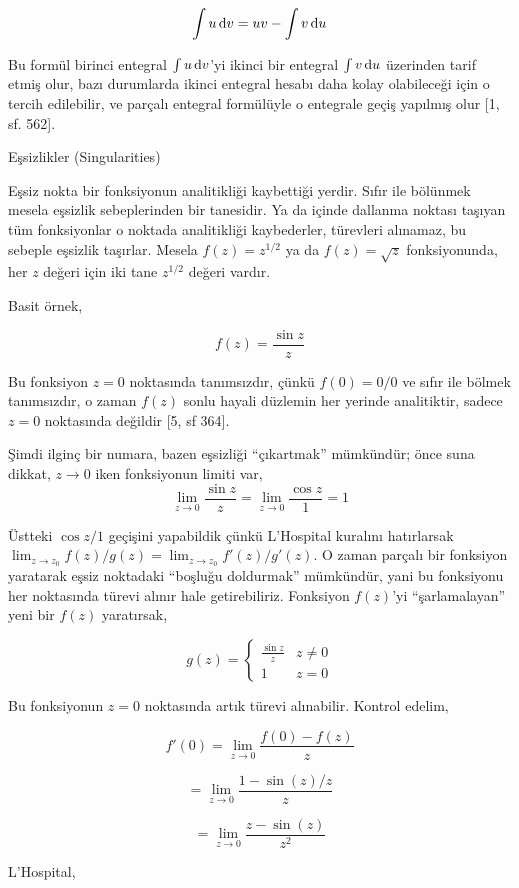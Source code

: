 \documentclass[12pt,fleqn]{article}\usepackage{../../common}
\begin{document}
$$ \int u \,\mathrm{d} v = uv - \int v \,\mathrm{d} u$$

Bu formül birinci entegral $\int u \,\mathrm{d} v$'yi ikinci bir entegral $\int v \,\mathrm{d} u$
üzerinden tarif etmiş olur, bazı durumlarda ikinci entegral hesabı daha kolay
olabileceği için o tercih edilebilir, ve parçalı entegral formülüyle o entegrale
geçiş yapılmış olur [1, sf. 562].

\newpage

Eşsizlikler (Singularities) 

Eşsiz nokta bir fonksiyonun analitikliği kaybettiği yerdir. Sıfır ile
bölünmek mesela eşsizlik sebeplerinden bir tanesidir. Ya da içinde dallanma
noktası taşıyan tüm fonksiyonlar o noktada analitikliği kaybederler,
türevleri alınamaz, bu sebeple eşsizlik taşırlar. Mesela $f(z) = z^{1/2}$
ya da $f(z) = \sqrt{z}$ fonksiyonunda, her $z$ değeri için iki tane
$z^{1/2}$ değeri vardır.

Basit örnek, 

$$ f(z) = \frac{ \sin z}{z} $$

Bu fonksiyon $z=0$ noktasında tanımsızdır, çünkü $f(0) = 0/0$ ve sıfır ile
bölmek tanımsızdır, o zaman $f(z)$ sonlu hayali düzlemin her yerinde
analitiktir, sadece $z=0$ noktasında değildir [5, sf 364]. 

Şimdi ilginç bir numara, bazen eşsizliği ``çıkartmak'' mümkündür; önce suna
dikkat, $z \to 0$ iken fonksiyonun limiti var,
$$ \lim_{z \to 0} \frac{ \sin z}{z} = \lim_{z \to 0} \frac{\cos z}{1} = 1 $$


Üstteki $\cos z/1$ geçişini yapabildik çünkü L'Hospital kuralını
hatırlarsak $\lim_{z \to z_0} f(z)/g(z) = \lim_{z \to z_0} f'(z)/g'(z)$. O
zaman parçalı bir fonksiyon yaratarak eşsiz noktadaki ``boşluğu doldurmak''
mümkündür, yani bu fonksiyonu her noktasında türevi alınır hale
getirebiliriz. Fonksiyon $f(z)$'yi ``şarlamalayan'' yeni bir $f(z)$
yaratırsak,

$$ 
g(z) = \left\{ \begin{array}{ll}
\frac{\sin z}{z} & z \ne 0 \\
1 & z = 0
\end{array} \right.
 $$

Bu fonksiyonun $z=0$ noktasında artık türevi alınabilir. Kontrol edelim, 

$$ f'(0) = \lim_{z \to 0} \frac{f(0)-f(z)}{z}  $$

$$ = \lim_{z \to 0} \frac{1-\sin(z)/z}{z} $$

$$ = \lim_{z \to 0} \frac{z-\sin(z)}{z^2} $$

L'Hospital,
\end{document}
